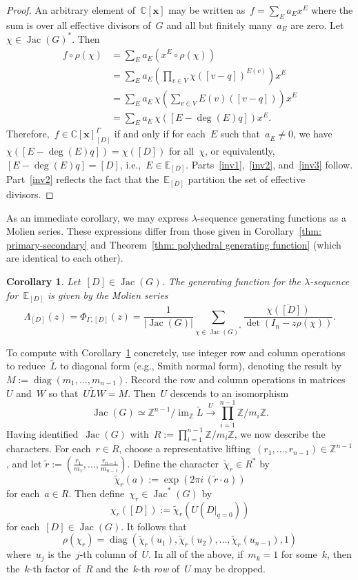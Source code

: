 \documentclass{amsart}
\newtheorem{cor}[thm]{Corollary}
\DeclareMathOperator{\Jac}{Jac}
\DeclareMathOperator{\diag}{diag}
\DeclareMathOperator{\im}{im}
\newcommand{\Z}{\mathbb{Z}}
\newcommand{\C}{\mathbb{C}}
\newcommand{\E}{\mathbb{E}}
\newcommand{\tL}{\tilde{L}}
\newcommand{\polyring}{\C[\mathbf{x}]}
\begin{document}
\begin{proof} An arbitrary element of~$\polyring$ may be written
  as~$f=\sum^{\,}_{E}a_Ex^E$ where the sum is over all effective divisors of~$G$
  and all but finitely many~$a_E$ are zero.  Let~$\chi\in\Jac(G)^{*}$.  Then
  \allowdisplaybreaks
  \begin{align*}
    f\circ\rho(\chi)
    &= \sum_{E}a^{\,}_E(x^E\circ\rho(\chi))\\
    &= \sum_{E}a^{\,}_E\textstyle\left(\prod_{v\in V}\chi([v-q])^{E(v)} \right)x^E\\
    &= \sum_{E}a^{\,}_E\textstyle\,\chi\!\left(\sum_{v\in V}E(v)([v-q])\right)x^E\\
    &= \sum_{E}a^{\,}_E\textstyle\,\chi\!\left([E-\deg(E)q]\right)x^E.
  \end{align*}
  Therefore,~$f\in\polyring^{\Gamma}_{[D]}$ if and only if for each~$E$ such
  that~$a^{\,}_E\neq0$, we have $\chi([E-\deg(E)q])=\chi([D])$ for all~$\chi$,
  or equivalently, $[E-\deg(E)q]=[D]$, i.e.,~$E\in\E_{[D]}$.
 Parts~\ref{inv1},~\ref{inv2}, and~\ref{inv3} follow.  Part~\ref{inv2} reflects
 the fact that the~$\E_{[D]}$ partition the set of effective divisors.
\end{proof}
As an immediate corollary, we may express $\lambda$-sequence
generating functions as a Molien series. These expressions differ from those given
 in Corollary~\ref{thm: primary-secondary} and Theorem~\ref{thm:
polyhedral generating function} (which are identical to each other).
\begin{cor}\label{cor: lambda-molien}
  Let~$[D]\in\Jac(G)$.  The generating function for the $\lambda$-sequence
  for~$\E_{[D]}$ is given by the Molien series
  \[
    \Lambda_{[D]}(z)=\Phi_{\Gamma,[D]}(z)
    =\frac{1}{|\Jac(G)|}\sum_{\chi\in\Jac(G)^{*}}\frac{\overline{\chi([D])}}{\det(I_n-z\rho(\chi))}.
  \]
\end{cor}

To compute with Corollary~\ref{cor: lambda-molien} concretely,  use
integer row and column operations to reduce~$\tL$ to diagonal form (e.g., Smith
normal form), denoting the result by~$M:=\diag(m_1,\dots,m_{n-1})$.  Record the
row and column operations in matrices~$U$ and~$W$ so that~$U\tL W = M$.
Then~$U$ descends to an isomorphism
\[
  \Jac(G)\simeq\Z^{n-1}/\im_{\Z}\tL\xrightarrow{\ U\ }\prod_{i=1}^{n-1}\Z/m_i\Z.
\]
Having identified~$\Jac(G)$ with~$R:=\prod_{i=1}^{n-1}\Z/m_i\Z$, we now describe
the characters.  For each~$r\in R$, choose a representative
lifting~$(r_1,\dots,r_{n-1})\in\Z^{n-1}$, and let $ \tilde{r} :=
\left(\frac{r_1}{m_1},\dots,\frac{r_{n-1}}{m_{n-1}} \right)$.  Define the
character~$\tilde{\chi}_r\in R^*$ by
\[
  \tilde{\chi}_r(a) :=\exp(2\pi i\,(\tilde{r}\cdot a))
\]
for each~$a\in R$.  Then define~$\chi_r\in\Jac^*(G)$
by
\[
  \chi_r([D]):=\tilde{\chi}_r(U(D|_{q=0}))
\]
for each~$[D]\in\Jac(G)$.  It follows that
\[
  \rho(\chi_r)=\diag(\tilde{\chi}_r(u_1),\tilde{\chi}_r(u_2),\dots,\tilde{\chi}_r(u_{n-1}),1)
\]
where~$u_j$ is the~$j$-th column of~$U$.  In all of the above, if~$m_k=1$ for
some~$k$, then the~$k$-th factor of~$R$ and the~$k$-th {\em row} of~$U$ may be
dropped.
\end{document}
